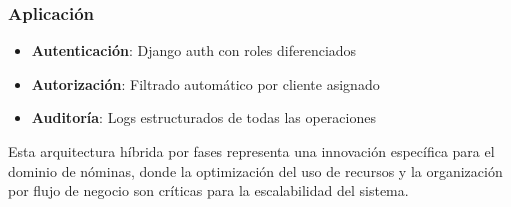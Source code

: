 \subsubsection{Aplicación}
\begin{itemize}
    \item \textbf{Autenticación}: Django auth con roles diferenciados
    \item \textbf{Autorización}: Filtrado automático por cliente asignado
    \item \textbf{Auditoría}: Logs estructurados de todas las operaciones
\end{itemize}

Esta arquitectura híbrida por fases representa una innovación específica para el dominio de nóminas, donde la optimización del uso de recursos y la organización por flujo de negocio son críticas para la escalabilidad del sistema.
